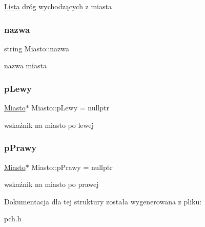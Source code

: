 \mbox{\hyperlink{class_lista}{Lista}} dróg wychodzących z miasta \mbox{\label{struct_miasto_ad0aaa5efaebeeff46f1673552035c7cb}} 
\subsubsection{\texorpdfstring{nazwa}{nazwa}}
{\footnotesize\ttfamily string Miasto\+::nazwa}

nazwa miasta \mbox{\label{struct_miasto_adc7b4137bfc3e62c95d9acf316fa620d}} 
\subsubsection{\texorpdfstring{p\+Lewy}{pLewy}}
{\footnotesize\ttfamily \mbox{\hyperlink{struct_miasto}{Miasto}}$\ast$ Miasto\+::p\+Lewy = nullptr}

wskaźnik na miasto po lewej \mbox{\label{struct_miasto_a3ceb4e22b45acaf62e032d2e233aea1e}} 
\subsubsection{\texorpdfstring{p\+Prawy}{pPrawy}}
{\footnotesize\ttfamily \mbox{\hyperlink{struct_miasto}{Miasto}}$\ast$ Miasto\+::p\+Prawy = nullptr}

wskaźnik na miasto po prawej 

Dokumentacja dla tej struktury została wygenerowana z pliku\+:\begin{DoxyCompactItemize}
\item 
pch.\+h\end{DoxyCompactItemize}
